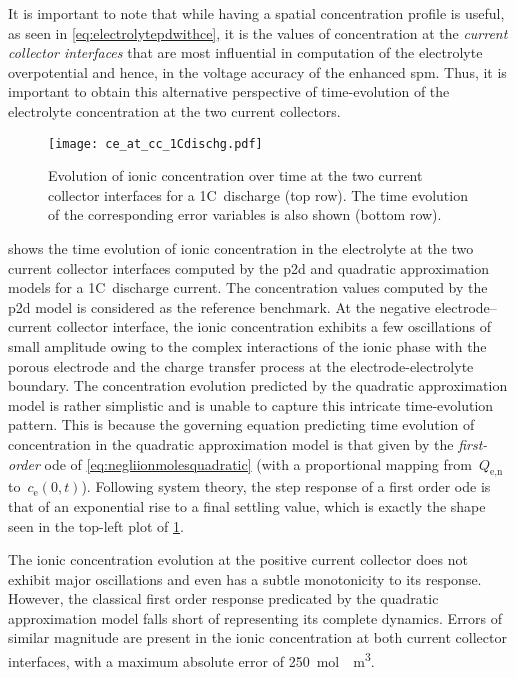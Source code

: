 It  is important  to  note that  while having  a  spatial concentration  profile
is  useful,  as  seen  in \cref{eq:electrolytepdwithce}, it  is  the  values  of
concentration  at   the  \emph{current  collector  interfaces}   that  are  most
influential in  computation of the  electrolyte overpotential and hence,  in the
voltage accuracy of the enhanced \gls{spm}. Thus, it is important to obtain this
alternative perspective  of time-evolution  of the electrolyte  concentration at
the two current collectors.

\begin{figure}[!htbp]
    \centering
    \texttt{[image: ce\_at\_cc\_1Cdischg.pdf]}
    \caption[Ionic concentrations at current collector
    interfaces over time for 1C~discharge]{Evolution of ionic concentration over
        time at the two current collector interfaces for a 1C~discharge (top
        row). The time evolution of the corresponding error variables is also
    shown (bottom row).}
    \label{fig:temporalcequadratic}
\end{figure}

 shows  the time evolution of  ionic concentration
in  the electrolyte  at the  two current  collector interfaces  computed by  the
\gls{p2d} and  quadratic approximation  models for a  1C~discharge  current. The
concentration  values computed  by  the  \gls{p2d} model  is  considered as  the
reference benchmark. At the negative electrode--current collector interface, the
ionic  concentration  exhibits  a  few oscillations  of  small  amplitude  owing
to  the complex  interactions  of  the ionic  phase  with  the porous  electrode
and  the charge  transfer process  at the  electrode-electrolyte boundary.  The
concentration  evolution  predicted  by  the quadratic  approximation  model  is
rather  simplistic  and  is  unable to  capture  this  intricate  time-evolution
pattern.  This  is because  the  governing  equation predicting  time  evolution
of  concentration  in  the  quadratic  approximation  model  is  that  given  by
the  \emph{first-order}  \gls{ode} of \cref{eq:negliionmolesquadratic}  (with  a
proportional mapping from~$Q_\text{e,n}$ to~$c_\text{e}(0,t)$). Following system
theory, the step response  of a first order \gls{ode} is  that of an exponential
rise to a final settling value, which  is exactly the shape seen in the top-left
plot of \cref{fig:temporalcequadratic}.

The ionic  concentration evolution  at the positive  current collector  does not
exhibit major oscillations  and even has a subtle monotonicity  to its response.
However,  the  classical  first  order  response  predicated  by  the  quadratic
approximation model falls short of representing its complete dynamics. Errors of
similar  magnitude  are present  in  the  ionic  concentration at  both  current
collector  interfaces, with  a maximum  absolute error  of \approx\SI{250}{\mole
\per \meter  \cubed}.


